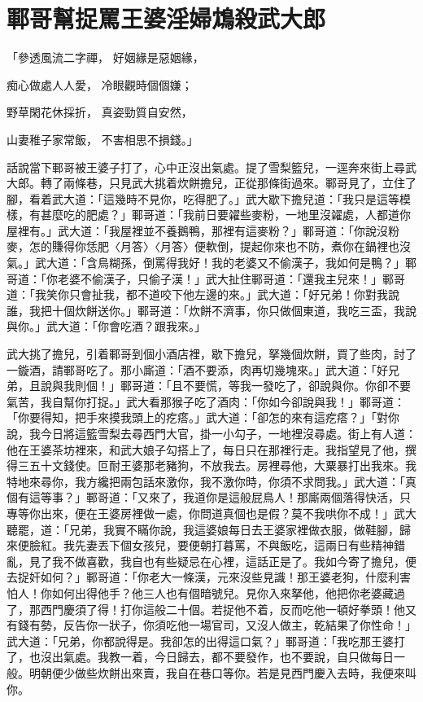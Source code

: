 %

\chapter{鄆哥幫捉罵王婆\KG 淫婦鴆殺武大郎}

\begin{showcontents}{}



「參透風流二字禪，  好姻緣是惡姻緣，

痴心做處人人愛，  冷眼觀時個個嫌；

野草閑花休採折，  真姿勁質自安然，

山妻稚子家常飯，  不害相思不損錢。」

話說當下鄆哥被王婆子打了，心中正沒出氣處。提了雪梨籃兒，一逕奔來街上尋武大郎。轉了兩條巷，只見武大挑着炊餅擔兒，正從那條街過來。鄆哥見了，立住了腳，看着武大道：「這幾時不見你，吃得肥了。」武大歇下擔兒道：「我只是這等模樣，有甚麼吃的肥處？」鄆哥道：「我前日要糴些麥粉，一地里沒糴處，人都道你屋裡有。」武大道：「我屋裡並不養鵝鴨，那裡有這麥粉？」鄆哥道：「你說沒粉麥，怎的賺得你恁肥〈月答〉〈月答〉便軟倒，提起你來也不防，煮你在鍋裡也沒氣。」武大道：「含鳥糊孫，倒罵得我好！我的老婆又不偷漢子，我如何是鴨？」鄆哥道：「你老婆不偷漢子，只偷子漢！」武大扯住鄆哥道：「還我主兒來！」鄆哥道：「我笑你只會扯我，都不道咬下他左邊的來。」武大道：「好兄弟！你對我說誰，我把十個炊餅送你。」鄆哥道：「炊餅不濟事，你只做個東道，我吃三盃，我說與你。」武大道：「你會吃酒？跟我來。」

武大挑了擔兒，引着鄆哥到個小酒店裡，歇下擔兒，拏幾個炊餅，買了些肉，討了一鏇酒，請鄆哥吃了。那小廝道：「酒不要添，肉再切幾塊來。」武大道：「好兄弟，且說與我則個！」鄆哥道：「且不要慌，等我一發吃了，卻說與你。你卻不要氣苦，我自幫你打捉。」武大看那猴子吃了酒肉：「你如今卻說與我！」鄆哥道：「你要得知，把手來摸我頭上的疙瘩。」武大道：「卻怎的來有這疙瘩？」「對你說，我今日將這籃雪梨去尋西門大官，掛一小勾子，一地裡沒尋處。街上有人道：他在王婆茶坊裡來，和武大娘子勾搭上了，每日只在那裡行走。我指望見了他，撰得三五十文錢使。叵耐王婆那老豬狗，不放我去。房裡尋他，大粟暴打出我來。我特地來尋你，我方纔把兩包話來激你，我不激你時，你須不求問我。」武大道：「真個有這等事？」鄆哥道：「又來了，我道你是這般屁鳥人！那廝兩個落得快活，只專等你出來，便在王婆房裡做一處，你問道真個也是假？莫不我哄你不成！」武大聽罷，道：「兄弟，我實不瞞你說，我這婆娘每日去王婆家裡做衣服，做鞋腳，歸來便臉紅。我先妻丟下個女孩兒，要便朝打暮罵，不與飯吃，這兩日有些精神錯亂，見了我不做喜歡，我自也有些疑忌在心裡，這話正是了。我如今寄了擔兒，便去捉奸如何？」鄆哥道：「你老大一條漢，元來沒些見識！那王婆老狗，什麼利害怕人！你如何出得他手？他三人也有個暗號兒。見你入來拏他，他把你老婆藏過了，那西門慶須了得！打你這般二十個。若捉他不着，反而吃他一頓好拳頭！他又有錢有勢，反告你一狀子，你須吃他一場官司，又沒人做主，乾結果了你性命！」武大道：「兄弟，你都說得是。我卻怎的出得這口氣？」鄆哥道：「我吃那王婆打了，也沒出氣處。我教一着，今日歸去，都不要發作，也不要說，自只做每日一般。明朝便少做些炊餅出來賣，我自在巷口等你。若是見西門慶入去時，我便來叫你。


\end{showcontents}
